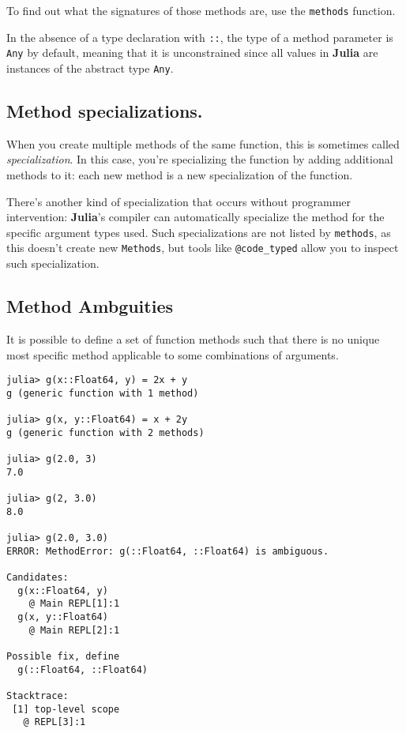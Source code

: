 \documentclass[
]{article}
\begin{document}
To find out what the signatures of those methods are, use the
\texttt{methods} function.

In the absence of a type declaration with \texttt{::}, the type of a
method parameter is \texttt{Any} by default, meaning that it is
unconstrained since all values in \textbf{Julia} are instances of the
abstract type \texttt{Any}.

\hypertarget{method-specializations.}{%
\subsection{Method specializations.}\label{method-specializations.}}

When you create multiple methods of the same function, this is sometimes
called \emph{specialization}. In this case, you're specializing the
function by adding additional methods to it: each new method is a new
specialization of the function.

There's another kind of specialization that occurs without programmer
intervention: \textbf{Julia}'s compiler can automatically specialize the
method for the specific argument types used. Such specializations are
not listed by \texttt{methods}, as this doesn't create new
\texttt{Methods}, but tools like \texttt{@code\_typed} allow you to
inspect such specialization.

\hypertarget{method-ambguities}{%
\subsection{Method Ambguities}\label{method-ambguities}}

It is possible to define a set of function methods such that there is no
unique most specific method applicable to some combinations of
arguments.

\begin{verbatim}
julia> g(x::Float64, y) = 2x + y
g (generic function with 1 method)

julia> g(x, y::Float64) = x + 2y
g (generic function with 2 methods)

julia> g(2.0, 3)
7.0

julia> g(2, 3.0)
8.0

julia> g(2.0, 3.0)
ERROR: MethodError: g(::Float64, ::Float64) is ambiguous.

Candidates:
  g(x::Float64, y)
    @ Main REPL[1]:1
  g(x, y::Float64)
    @ Main REPL[2]:1

Possible fix, define
  g(::Float64, ::Float64)

Stacktrace:
 [1] top-level scope
   @ REPL[3]:1
\end{verbatim}
\end{document}
